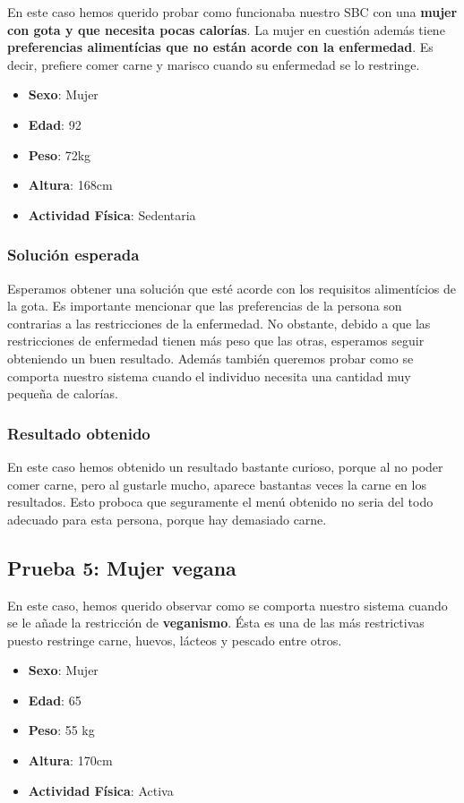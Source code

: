 \documentclass[11]{article}
\begin{document}
En este caso hemos querido probar como funcionaba nuestro SBC con una \textbf{mujer con gota y que necesita pocas calorías}. La mujer en cuestión además tiene \textbf{preferencias alimentícias que no están acorde con la enfermedad}. Es decir, prefiere comer carne y marisco cuando su enfermedad se lo restringe. 

\begin{itemize}
\item \textbf{Sexo}: Mujer
\item \textbf{Edad}: 92
\item \textbf{Peso}: 72kg 
\item \textbf{Altura}: 168cm
\item \textbf{Actividad Física}: Sedentaria
\end{itemize}

\subsubsection{Solución esperada}
Esperamos obtener una solución que esté acorde con los requisitos alimentícios de la gota. Es importante mencionar que las preferencias de la persona son contrarias a las restricciones de la enfermedad. No obstante, debido a que las restricciones de enfermedad tienen más peso que las otras, esperamos seguir obteniendo un buen resultado. Además también queremos probar como se comporta nuestro sistema cuando el individuo necesita una cantidad muy pequeña de calorías. 

\subsubsection{Resultado obtenido}

En este caso hemos obtenido un resultado bastante curioso, porque al no poder comer carne, pero al gustarle mucho, aparece bastantas veces la carne en los resultados. Esto proboca que seguramente el menú obtenido no seria del todo adecuado para esta persona, porque hay demasiado carne.

\subsection{Prueba 5: Mujer vegana}
En este caso, hemos querido observar como se comporta nuestro sistema cuando se le añade la restricción de \textbf{veganismo}. Ésta es una de las más restrictivas puesto restringe carne, huevos, lácteos y pescado entre otros. 

\begin{itemize}
\item \textbf{Sexo}: Mujer
\item \textbf{Edad}: 65
\item \textbf{Peso}: 55 kg
\item \textbf{Altura}: 170cm
\item \textbf{Actividad Física}: Activa
\end{itemize}
\end{document}
